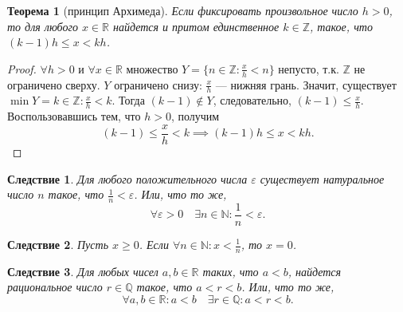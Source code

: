 \documentclass[a4paper,12pt]{article} %
\newtheorem{theorem}{Теорема}[section]
\newtheorem{corollary}{Следствие}[theorem]
\theoremstyle{remark}
\theoremstyle{definition}
\begin{document}
\begin{theorem}[принцип Архимеда]
    Если фиксировать произвольное число $h>0$, то для любого $x\in \mathbb{R}$ найдется и притом единственное $k\in \mathbb{Z}$,
    такое, что $(k-1)h \le  x < kh$.
\end{theorem}
\begin{proof}
    $\forall h>0$ и $\forall x \in \mathbb{R}$ множество $\displaystyle Y = \{n \in \mathbb{Z} : \frac{x}{h} < n\}$ непусто,
    т.к. $\mathbb{Z}$ не ограничено сверху. $Y$ ограничено снизу: $\displaystyle \frac{x}{h}$ --- нижняя грань.
    Значит, существует $\displaystyle \min Y = k\in \mathbb{Z} : \frac{x}{h} < k$. Тогда $(k-1)\not \in Y$,
    следовательно, $\displaystyle (k-1) \le \frac{x}{h}$. Воспользовавшись тем, что $h > 0$, получим
    \[(k-1)\le \frac{x}{h} < k \implies (k-1)h \le x < kh.\] 
\end{proof}
\begin{corollary}
    Для любого положительного числа $\varepsilon$ существует натуральное число $n$ такое,
    что $\displaystyle \frac{1}{n} < \varepsilon$. Или, что то же,
    \[\forall \varepsilon > 0 \quad \exists n \in \mathbb{N} : \frac{1}{n} < \varepsilon.\] 
\end{corollary}
\begin{corollary}
    Пусть $x\ge 0$. Если $\displaystyle \forall n \in \mathbb{N} : x < \frac{1}{n}$, то $x=0$.
\end{corollary}
\begin{corollary}
    Для любых чисел $a, b \in \mathbb{R}$ таких, что $a < b$, найдется рациональное число $r\in \mathbb{Q}$ такое,
    что $a < r < b$. Или, что то же,
    \[\forall a, b \in \mathbb{R} : a < b \quad \exists r \in \mathbb{Q} : a < r < b.\] 
\end{corollary}
\end{document}
